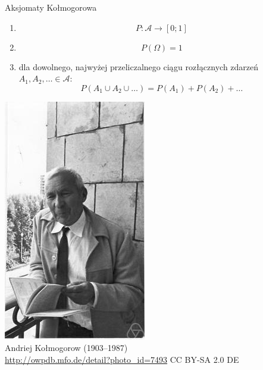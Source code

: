 \documentclass{beamer}
\begin{document}
\begin{frame}{Aksjomaty Kołmogorowa}
\begin{minipage}{.6\textwidth}
\begin{enumerate}
\item \[P\colon \mathcal{A} \to \left[0;1\right]\]
\item \[P(\Omega)=1\]
\item dla dowolnego, najwyżej przeliczalnego ciągu rozłącznych zdarzeń $A_1, A_2, \ldots \in \mathcal{A}$: \[ P(A_1\cup A_2\cup \ldots)=P(A_1)+P(A_2)+\ldots\]
\end{enumerate}
\end{minipage}
\begin{minipage}{.39\textwidth}
\centering \includegraphics[width=\textwidth,clip,viewport=0 0 10cm 11cm]{kolmogorov.jpg} \\
Andriej Kołmogorow (1903--1987) \\
{\tiny \url{http://owpdb.mfo.de/detail?photo_id=7493} CC BY-SA 2.0 DE}
\end{minipage}
\end{frame}
\end{document}
